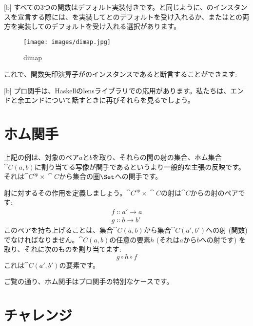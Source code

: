 [b]
すべての3つの関数はデフォルト実装付きです。と同じように、のインスタンスを宣言する際には、を実装してとのデフォルトを受け入れるか、またはとの両方を実装してのデフォルトを受け入れる選択があります。

\begin{figure}[H]
  \centering
  \texttt{[image: images/dimap.jpg]}
  \caption{dimap}
\end{figure}

\noindent
これで、関数矢印演算子がのインスタンスであると断言することができます: 

[b]
プロ関手は、Haskellのlensライブラリでの応用があります。私たちは、エンドと余エンドについて話すときに再びそれらを見るでしょう。

\section{ホム関手}

上記の例は、対象のペア$a$と$b$を取り、それらの間の射の集合、ホム集合$\cat{C}(a, b)$に割り当てる写像が関手であるというより一般的な主張の反映です。それは$\cat{C}^\mathit{op}\times{}\cat{C}$から集合の圏$\Set$への関手です。

射に対するその作用を定義しましょう。$\cat{C}^\mathit{op}\times{}\cat{C}$の射は$\cat{C}$からの射のペアです: 
\begin{gather*}
  f \Colon a' \to a \\
  g \Colon b \to b'
\end{gather*}
このペアを持ち上げることは、集合$\cat{C}(a, b)$から集合$\cat{C}(a', b')$への射 (関数) でなければなりません。$\cat{C}(a, b)$の任意の要素$h$ (それは$a$から$b$への射です) を取り、それに次のものを割り当てます: 
\[g \circ h \circ f\]
これは$\cat{C}(a', b')$の要素です。

ご覧の通り、ホム関手はプロ関手の特別なケースです。

\section{チャレンジ}

